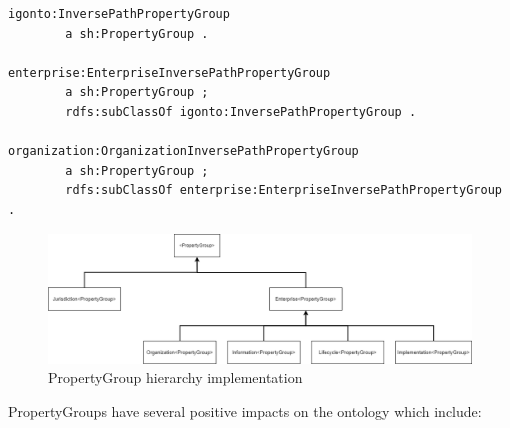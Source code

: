 \documentclass[
  a4paper,  %
  twoside,  %
  bibliography=totoc,
  headsepline,
  cleardoublepage=empty,
  parskip=half,
  draft=false
]{scrbook}
\begin{document}
\begin{lstlisting}[style=turtle, caption={SHACL PropertyGroup definition \cite{SHACL}}]
igonto:InversePathPropertyGroup 
        a sh:PropertyGroup .

enterprise:EnterpriseInversePathPropertyGroup 
        a sh:PropertyGroup ;
        rdfs:subClassOf igonto:InversePathPropertyGroup .

organization:OrganizationInversePathPropertyGroup 
        a sh:PropertyGroup ;
        rdfs:subClassOf enterprise:EnterpriseInversePathPropertyGroup .
\end{lstlisting}\label{lst:shacl_propertyGroupImplementation}

\begin{figure}
  \centering
  \includegraphics[width=\textwidth]{graphics/GroupHierarchy.drawio.png}
  \caption{PropertyGroup hierarchy implementation}
  \label{fig:PropertyGroupHierarchy}
\end{figure}

PropertyGroups have several positive impacts on the ontology which include: \\
\end{document}
